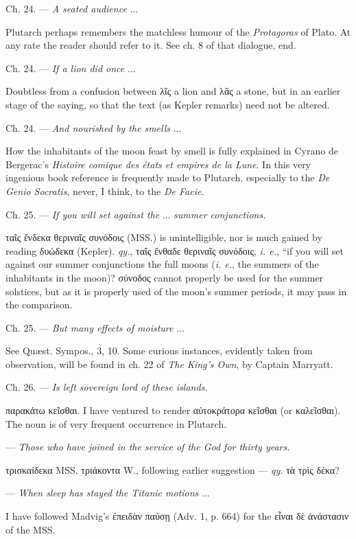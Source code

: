 \documentclass[a4paper, 11pt, oneside, polutonikogreek, english]{article}
\begin{document}
Ch. 24. --- \emph{A seated audience} ...

Plutarch perhaps remembers the matchless humour of the \emph{Protagoras} of Plato. At any rate the reader should refer to it. See ch. 8 of that dialogue, end.

Ch. 24. --- \emph{If a lion did once} ...

Doubtless from a confusion between λῖς a lion and λᾶς a stone, but in an earlier stage of the saying, so that the text (as Kepler remarks) need not be altered.

Ch. 24. --- \emph{And nourished by the smells} ... 

How the inhabitants of the moon feast by smell is fully explained in Cyrano de Bergerac's \emph{Histoire comique des états et empires de la Lune}. In this very ingenious book reference is frequently made to Plutarch, especially to the \emph{De Genio Socratis}, never, I think, to the \emph{De Facie}.

Ch. 25. --- \emph{If you will set against the} ... \emph{summer conjunctions.}

ταῖς ἕνδεκα θεριναῖς συνόδοις (MSS.) is unintelligible, nor is much gained by reading δυώδεκα (Kepler). \emph{qy.}, ταῖς ἔνθαδε θεριναῖς συνόδοις, \emph{i. e.}, ``if you will set against our summer conjunctions the full moons (\emph{i. e.}, the summers of the inhabitants in the moon)? σύνοδος cannot properly be used for the summer solstices, but as it is properly used of the moon's summer periods, it may pass in the comparison.

Ch. 25. --- \emph{But many effects of moisture} ...

See Quæst. Sympos., 3, 10. Some curious instances, evidently taken from observation, will be found in ch. 22 of \emph{The King's Own}, by Captain Marryatt.

Ch. 26. --- \emph{Is left sovereign lord of these islands.}

παρακάτω κεῖσθαι. I have ventured to render αὐτοκράτορα κεῖσθαι (or καλεῖσθαι). The noun is of very frequent occurrence in Plutarch.

--- \emph{Those who have joined in the service of the God for thirty years.}

τρισκαίδεκα MSS. τριάκοντα W., following earlier suggestion --- \emph{qy.} τὰ τρὶς δέκα?

--- \emph{When sleep has stayed the Titanic motions} ...

I have followed Madvig's ἐπειδὰν παύσῃ (Adv. 1, p. 664) for the εἶναι δὲ ἀνάστασιν of the MSS.
\end{document}
